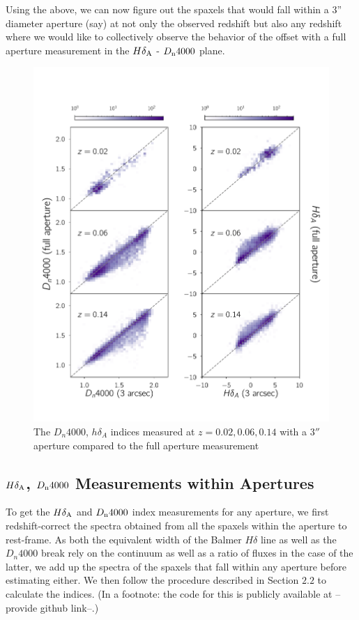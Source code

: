 Using the above, we can now figure out the spaxels that would fall within a 3'' diameter aperture (say) at not only the observed redshift but also any redshift where we would like to collectively observe the behavior of the offset with a full aperture measurement in the $H\delta_{\rm A}$ - $D_{\rm n}4000$ plane.


\begin{figure}
\includegraphics[width=\textwidth]{figures/full_aperture_comparisons.pdf}
\caption[The $D_{n}4000$, $h\delta_{A}$ indices measured at $z = 0.02,0.06,0.14$ with a $3''$ aperture compared to the full aperture measurement]
{ The $D_{n}4000$, $h\delta_{A}$ indices measured at $z = 0.02,0.06,0.14$ with a $3''$ aperture compared to the full aperture measurement
\label{fig:redshift_comparison}}
\end{figure}


\subsection{$H\delta_{\rm A}$, $D_{\rm n}4000$ Measurements within Apertures}
To get the $H\delta_{\rm A}$ and $D_{\rm n}4000$ index measurements for any aperture, we first redshift-correct the spectra obtained from all the spaxels within the aperture to rest-frame. As both the equivalent width of the Balmer $H\delta$ line as well as the $D_{n}4000$ break rely on the continuum as well as a ratio of fluxes in the case of the latter, we add up the spectra of the spaxels that fall within any aperture before estimating either. We then follow the procedure described in Section $2.2$ to calculate the indices. (In a footnote: the code for this is publicly available at --provide github link--.)

